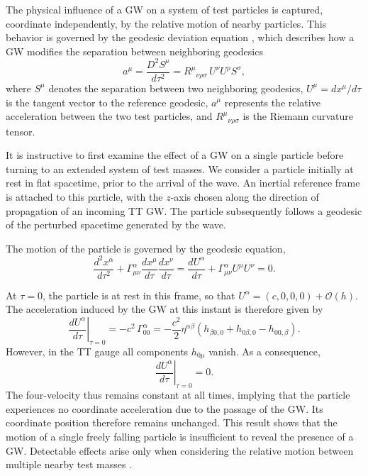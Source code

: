 The physical influence of a GW on a system of test particles is
captured, coordinate independently, by the relative motion of nearby
particles. This behavior is governed by the geodesic
deviation equation \cite{llibrecarroll2004lectures}, which describes how a GW modifies the
separation between neighboring geodesics
\begin{equation}
a^\mu
= \frac{D^2 S^\mu}{d \tau^2}
= R^\mu{}_{\nu\rho\sigma} \, U^\nu U^\rho S^\sigma ,
\label{geodesicdeviation}
\end{equation}
where $S^\mu$ denotes the separation between two neighboring geodesics, $U^\mu = dx^\mu / d\tau$ is the tangent vector to the reference geodesic, $a^\mu$ represents the relative acceleration between the two test particles, and $R^\mu{}_{\nu\rho\sigma}$ is the Riemann curvature tensor.


It is instructive to first examine the effect of a GW on a single particle
before turning to an extended system of test masses.
We consider a particle initially at rest in flat spacetime, prior to the
arrival of the wave. An inertial reference frame is attached to this particle,
with the $z$-axis chosen along the direction of propagation of an incoming
TT GW. The particle subsequently follows
a geodesic of the perturbed spacetime generated by the wave.

The motion of the particle is governed by the geodesic equation,
\begin{equation}
\frac{d^2 x^\alpha}{d\tau^2}
+ \Gamma^\alpha_{\mu\nu}
\frac{d x^\mu}{d\tau}
\frac{d x^\nu}{d\tau}
=
\frac{d U^\alpha}{d\tau}
+ \Gamma^\alpha_{\mu\nu} U^\mu U^\nu
= 0 .
\end{equation}

At $\tau = 0$, the particle is at rest in this frame, so that
$U^\alpha = (c,0,0,0)+ \mathcal{O}(h)$. The acceleration induced by the GW at
this instant is therefore given by
\begin{equation}
\left. \frac{d U^\alpha}{d\tau} \right|_{\tau=0}
=
- c^2\,\Gamma^\alpha_{00}
=
- \frac{c^2}{2} \eta^{\alpha\beta}
\left(
h_{\beta 0 , 0}
+ h_{0 \beta , 0}
- h_{00 , \beta}
\right).
\end{equation}
However, in the TT gauge all components $h_{0\mu}$ vanish.
As a consequence,
\begin{equation}
\left. \frac{d U^\alpha}{d\tau} \right|_{\tau=0} = 0 .
\end{equation}
The four-velocity thus remains constant at all times, implying that the
particle experiences no coordinate acceleration due to the passage of the
GW. Its coordinate position therefore remains unchanged. This result shows that the motion of a single freely falling particle is
insufficient to reveal the presence of a GW. Detectable effects
arise only when considering the relative motion between multiple nearby test
masses \cite{llibreFerrariValeriaGR}.



